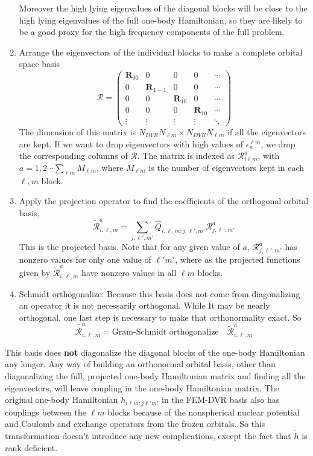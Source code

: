 \documentclass[%
pra%
,twocolumn%
,amssymb, nobibnotes, aps,
longbibliography
]{revtex4-1}
\begin{document}
\begin{enumerate}
{Moreover the high lying eigenvalues of the diagonal blocks will be close to the high lying eigenvalues of the full one-body Hamiltonian, so they are likely to be a good proxy for the high frequency components of the full problem.
}
\item{Arrange the eigenvectors of the individual blocks to make a complete orbital space basis
\begin{equation}
\boldsymbol{\mathcal{R}}=\begin{pmatrix}
\mathbf{R}_{0 0} & 0&0&0& \cdots \\
0&\mathbf{R}_{1 -1} &0&0&\cdots \\
0&0&\mathbf{R}_{1 0} &0&\cdots \\
0&0 &0&\mathbf{R}_{1 0}&\cdots \\
\vdots&\vdots&\vdots&\vdots&\ddots
\end{pmatrix}
\end{equation}
The dimension of this matrix is $N_{DVR} N_{\ell m} \times N_{DVR} N_{\ell m}$ if all the eigenvectors are kept. If we want to drop eigenvectors 
with high values of $\epsilon_{n}^{\ell m}$, we drop the corresponding columns of $\boldsymbol{\mathcal{R}}$.  The matrix is indexed as
$\mathcal{R}_{i \ell m}^{a}$, with $a = 1,2 \cdots \sum_{\ell m}M_{\ell m}$, where $M_{\ell m}$ is the number of eigenvectors kept in  each $\ell,m$ block.
}
\item{Apply the projection operator to find the coefficients of the orthogonal orbital basis,
\begin{equation}
\tilde{\mathcal{R}}_{i,\ell,m}^a=\sum_{j,\ell',m'} \hat{Q}_{i,\ell,m ; j, \ell',m'} \mathcal{R}_{j,\ell',m'}^{a}
\end{equation}
This is the projected basis. Note that for any given value of $a$, $ \mathcal{R}_{j,\ell',m'}^{a}$ has nonzero values for only one value of $\ell' m'$, where as the projected functions given by $\tilde{\mathcal{R}}_{i,\ell,m}^a$ have nonzero values in all $\ell m$ blocks.
}
\item{Schmidt orthogonalize:  Because this basis does not come from diagonalizing an operator it is not necessarily orthogonal.  While It may be nearly orthogonal, one last step is necessary to make that orthonormality exact.  So
\begin{equation}
\bar{\bar{{\mathcal{R}}}}_{i,\ell,m}^a = \textrm{Gram-Schmidt orthogonalize}\quad \tilde{\mathcal{R}}_{i,\ell,m}^a 
\end{equation}
}
\end{enumerate}
This basis does \textbf{not} diagonalize the diagonal blocks of the one-body Hamiltonian any longer.  Any way of building an orthonormal orbital basis, other than diagonalizing the full, projected one-body Hamiltonian matrix and finding all the eigenvectors, will leave coupling in the one-body Hamiltonian matrix.  The original one-body Hamiltonian $h_{i \ell m;j \ell' m'}$ in the FEM-DVR basis also has couplings between the $\ell m$ blocks because of the nonspherical nuclear potential and Coulomb and exchange operators from the frozen orbitals.  So this transformation doesn't introduce any new complications, except the fact that $\tilde{h}$ is rank deficient.
\end{document}
